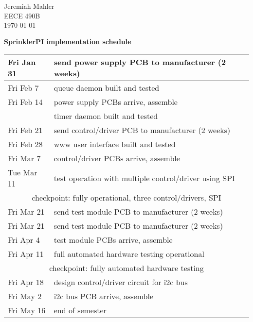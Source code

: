 \documentclass{article}
\begin{document}
Jeremiah Mahler \\
EECE 490B \\
\today

\vspace{0.25in}

\begin{center}
\textbf{SprinklerPI implementation schedule}
{\renewcommand{\arraystretch}{2}%
\begin{tabular}{|l|l|}
\hline
Fri Jan 31 & send power supply PCB to manufacturer (2 weeks) \\
\hline
Fri Feb 7 & queue daemon built and tested \\
\hline
Fri Feb 14 	& power supply PCBs arrive, assemble \\
			& timer daemon built and tested \\
\hline
Fri Feb 21 & send control/driver PCB to manufacturer (2 weeks) \\
\hline
Fri Feb 28 & www user interface built and tested \\
\hline
Fri Mar 7 & control/driver PCBs arrive, assemble \\
\hline
Tue Mar 11 & test operation with multiple control/driver using SPI \\
\hline
\multicolumn{2}{|c|}{checkpoint: fully operational, three control/drivers, SPI} \\
\hline
Fri Mar 21 & send test module PCB to manufacturer (2 weeks) \\
\hline
Fri Mar 21 & send test module PCB to manufacturer (2 weeks) \\
\hline
Fri Apr 4 & test module PCBs arrive, assemble \\
\hline
Fri Apr 11 & full automated hardware testing operational \\
\hline
\multicolumn{2}{|c|}{checkpoint: fully automated hardware testing} \\
\hline
Fri Apr 18 & design control/driver circuit for i2c bus \\
\hline
Fri May 2 & i2c bus PCB arrive, assemble \\
\hline
Fri May 16 & end of semester \\
\hline
\end{tabular}
}
\end{center}
\end{document}
